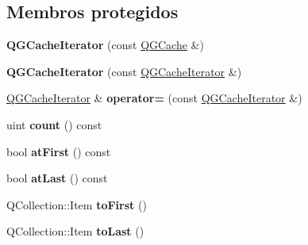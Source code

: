 \subsection*{Membros protegidos}
\begin{DoxyCompactItemize}
\item 
\hypertarget{class_q_g_cache_iterator_a2c3adc4aeee1a3339688bb2dc9b4a057}{{\bfseries Q\-G\-Cache\-Iterator} (const \hyperlink{class_q_g_cache}{Q\-G\-Cache} \&)}\label{class_q_g_cache_iterator_a2c3adc4aeee1a3339688bb2dc9b4a057}

\item 
\hypertarget{class_q_g_cache_iterator_a2c92eacbdf7019e3ab9de96929dc92cc}{{\bfseries Q\-G\-Cache\-Iterator} (const \hyperlink{class_q_g_cache_iterator}{Q\-G\-Cache\-Iterator} \&)}\label{class_q_g_cache_iterator_a2c92eacbdf7019e3ab9de96929dc92cc}

\item 
\hypertarget{class_q_g_cache_iterator_a9ea50b6189003d3ae04da8b7c4c2b1ae}{\hyperlink{class_q_g_cache_iterator}{Q\-G\-Cache\-Iterator} \& {\bfseries operator=} (const \hyperlink{class_q_g_cache_iterator}{Q\-G\-Cache\-Iterator} \&)}\label{class_q_g_cache_iterator_a9ea50b6189003d3ae04da8b7c4c2b1ae}

\item 
\hypertarget{class_q_g_cache_iterator_a774149fc271ebaba2aabcd183a836e8f}{uint {\bfseries count} () const }\label{class_q_g_cache_iterator_a774149fc271ebaba2aabcd183a836e8f}

\item 
\hypertarget{class_q_g_cache_iterator_a31ccd7308e8fa3fa71c847fec15eceb3}{bool {\bfseries at\-First} () const }\label{class_q_g_cache_iterator_a31ccd7308e8fa3fa71c847fec15eceb3}

\item 
\hypertarget{class_q_g_cache_iterator_aa158c7c7d48ef7ab1e349457aa795878}{bool {\bfseries at\-Last} () const }\label{class_q_g_cache_iterator_aa158c7c7d48ef7ab1e349457aa795878}

\item 
\hypertarget{class_q_g_cache_iterator_adcebe55449ce6d00c152205e52d85afe}{Q\-Collection\-::\-Item {\bfseries to\-First} ()}\label{class_q_g_cache_iterator_adcebe55449ce6d00c152205e52d85afe}

\item 
\hypertarget{class_q_g_cache_iterator_a498dc59cfb295c427b6488c1d7d1b1e1}{Q\-Collection\-::\-Item {\bfseries to\-Last} ()}\label{class_q_g_cache_iterator_a498dc59cfb295c427b6488c1d7d1b1e1}


\end{DoxyCompactItemize}
